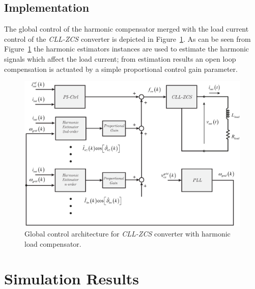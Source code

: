 \documentclass[11pt,a4paper,oneside]{book}
\numberwithin{equation}{section}
\theoremstyle{it}
\theoremstyle{definition}
\begin{document}
\begin{onehalfspace}
\section{Implementation}
The global control of the harmonic compensator merged with the load current control of the \textit{CLL-ZCS} converter is depicted in Figure~\ref{ctrl_architecture}. As can be seen from Figure~\ref{ctrl_architecture} the harmonic estimators instances are used to estimate the harmonic signals which affect the load current; from estimation results an open loop compensation is actuated by a simple proportional control gain parameter.
\begin{figure}[H]
	\centering
	\includegraphics[width = 460pt, angle = 0, 
	keepaspectratio]{figures/ctrl_architecture_2.eps}
	\captionsetup{width=0.5\textwidth, font=small}	
	\caption{Global control architecture for \textit{CLL-ZCS} converter with harmonic load compensator.}
	\label{ctrl_architecture}
\end{figure}

\chapter{Simulation Results}

\end{onehalfspace}
\end{document}
